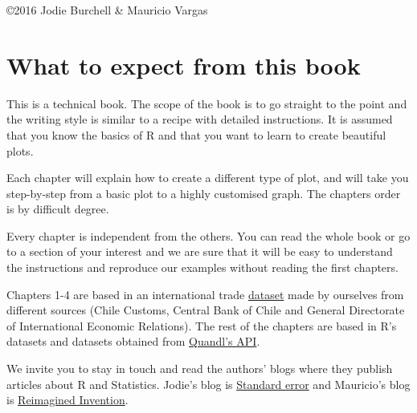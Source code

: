 \documentclass[11pt, oneside]{report}
\begin{document}
\copyright 2016 Jodie Burchell \& Mauricio Vargas

\newpage
\tableofcontents
\newpage

%
%

\setcounter{page}{1}

\chapter*{What to expect from this book}

This is a technical book. The scope of the book is to go straight to the point and the writing style is similar to a recipe with detailed instructions. It is assumed that you know the basics of R and that you want to learn to create beautiful plots. 

Each chapter will explain how to create a different type of plot, and will take you step-by-step from a basic plot to a highly customised graph. The chapters order is by difficult degree.

Every chapter is independent from the others. You can read the whole book or go to a section of your interest and we are sure that it will be easy to understand the instructions and reproduce our examples without reading the first chapters.

Chapters 1-4 are based in an international trade
\href{http://pachamaltese.github.io/stats/trade-chile-china/copper-data-for-chapter.csv}{dataset}
made by ourselves from different sources (Chile Customs, Central Bank of
Chile and General Directorate of International Economic Relations). The rest of the chapters are based in R's datasets and datasets obtained from \href{https://www.quandl.com/}{Quandl's API}.

We invite you to stay in touch and read the authors' blogs where they publish articles about R and Statistics. Jodie's blog is \href{http://t-redactyl.io/}{Standard error} and Mauricio's blog is \href{http://pachamaltese.github.io/}{Reimagined Invention}.













\end{document}
